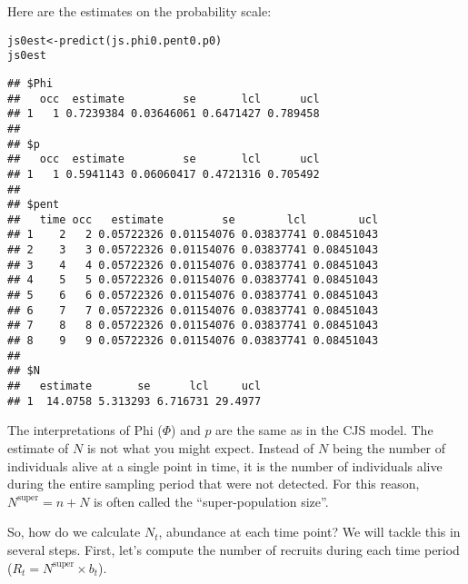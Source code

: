 \documentclass[12pt]{article}\usepackage[]{graphicx}\usepackage[]{xcolor}
\makeatletter
\newcommand{\hldef}[1]{\textcolor[rgb]{0,0,0}{#1}}%
\newcommand{\hlkwb}[1]{\textcolor[rgb]{0,0.341,0.682}{#1}}%
\newcommand{\hlkwd}[1]{\textcolor[rgb]{0.004,0.004,0.506}{#1}}%
\newenvironment{kframe}{%
 \def\at@end@of@kframe{}%
 \ifinner\ifhmode%
  \def\at@end@of@kframe{\end{minipage}}%
  \begin{minipage}{\columnwidth}%
 \fi\fi%
 \def\FrameCommand##1{\hskip\@totalleftmargin \hskip-\fboxsep
 \colorbox{shadecolor}{##1}\hskip-\fboxsep
     \hskip-\linewidth \hskip-\@totalleftmargin \hskip\columnwidth}%
 \MakeFramed {\advance\hsize-\width
   \@totalleftmargin\z@ \linewidth\hsize
   \@setminipage}}%
 {\par\unskip\endMakeFramed%
 \at@end@of@kframe}
\newenvironment{knitrout}{}{} %
\makeatother
\begin{document}
Here are the estimates on the probability scale:


\begin{knitrout}\small
{}\color{fgcolor}\begin{kframe}
\begin{alltt}
\hldef{js0est} \hlkwb{<-} \hlkwd{predict}\hldef{(js.phi0.pent0.p0)}
\hldef{js0est}
\end{alltt}
\begin{verbatim}
## $Phi
##   occ  estimate         se       lcl      ucl
## 1   1 0.7239384 0.03646061 0.6471427 0.789458
## 
## $p
##   occ  estimate         se       lcl      ucl
## 1   1 0.5941143 0.06060417 0.4721316 0.705492
## 
## $pent
##   time occ   estimate         se        lcl        ucl
## 1    2   2 0.05722326 0.01154076 0.03837741 0.08451043
## 2    3   3 0.05722326 0.01154076 0.03837741 0.08451043
## 3    4   4 0.05722326 0.01154076 0.03837741 0.08451043
## 4    5   5 0.05722326 0.01154076 0.03837741 0.08451043
## 5    6   6 0.05722326 0.01154076 0.03837741 0.08451043
## 6    7   7 0.05722326 0.01154076 0.03837741 0.08451043
## 7    8   8 0.05722326 0.01154076 0.03837741 0.08451043
## 8    9   9 0.05722326 0.01154076 0.03837741 0.08451043
## 
## $N
##   estimate       se      lcl     ucl
## 1  14.0758 5.313293 6.716731 29.4977
\end{verbatim}
\end{kframe}
\end{knitrout}

The interpretations of Phi ($\Phi$) and $p$ are the same as in the CJS
model. The estimate of $N$ is not what you might expect. Instead of
$N$ being the number of individuals alive at a single point in time,
it is the number of individuals alive during the entire sampling
period that were not detected. For this reason,
$N^{\mathrm{super}}=n+N$ is often called the ``super-population size''.

So, how do we calculate $N_t$, abundance at each time point? We will
tackle this in several steps. First, let's compute the number of
recruits during each time period ($R_t=N^{\mathrm{super}}\times b_t$).  
\end{document}
